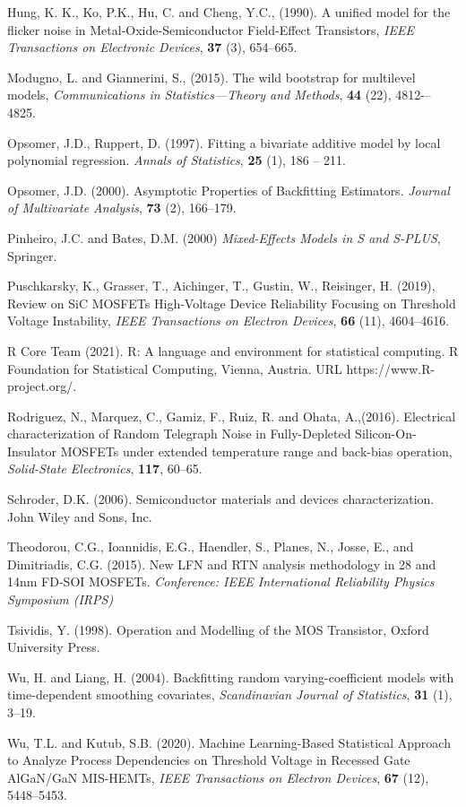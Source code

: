 \documentclass[sn-mathphys]{sn-jnl}%
\theoremstyle{thmstyleone}%
\theoremstyle{thmstyletwo}%
\theoremstyle{thmstylethree}%
\begin{document}
\begin{thebibliography}{00}
	 Hung, K. K., Ko, P.K., Hu, C. and Cheng, Y.C., (1990). A unified model for the flicker noise in Metal-Oxide-Semiconductor Field-Effect Transistors, {\it IEEE Transactions on Electronic Devices}, {\bf 37} (3), 654--665.
	
	 Modugno, L. and Giannerini, S., (2015). The wild bootstrap for multilevel models, {\it Communications in Statistics—Theory and Methods}, {\bf 44} (22), 4812-–4825.
	
	 Opsomer, J.D., Ruppert, D. (1997). Fitting a bivariate additive model by local polynomial regression. {\it Annals of Statistics}, {\bf 25} (1), 186 -- 211.
	
	 Opsomer, J.D. (2000). Asymptotic Properties of Backfitting Estimators. {\it Journal of Multivariate Analysis}, {\bf 73} (2),  166--179.
	
	 Pinheiro, J.C. and Bates, D.M. (2000) {\it Mixed-Effects Models in S and S-PLUS}, Springer.
	
	 Puschkarsky, K., Grasser, T., Aichinger, T., Gustin, W., Reisinger, H. (2019), Review on SiC MOSFETs High-Voltage Device Reliability Focusing on Threshold Voltage Instability, {\it IEEE Transactions on Electron Devices}, {\bf 66} (11), 4604--4616.
	
	R Core Team (2021). R: A language and environment for statistical computing. R Foundation for Statistical Computing, Vienna, Austria. URL
	https://www.R-project.org/.
	
	
	 Rodriguez, N., Marquez, C., Gamiz, F., Ruiz, R. and Ohata, A.,(2016).  Electrical characterization of Random Telegraph Noise in Fully-Depleted Silicon-On-Insulator MOSFETs under extended temperature range and back-bias operation, {\it Solid-State Electronics}, {\bf 117}, 60--65.
	
	 Schroder, D.K. (2006). Semiconductor materials and devices characterization. John Wiley and Sons, Inc.
	
	
	 Theodorou, C.G., Ioannidis, E.G., Haendler, S., Planes, N., Josse, E., and Dimitriadis, C.G. (2015). New LFN and RTN analysis methodology in 28 and 14nm FD-SOI MOSFETs. {\it Conference: IEEE International Reliability Physics Symposium (IRPS)}
	
	
	 Tsividis, Y. (1998). Operation and Modelling of the MOS Transistor, Oxford University Press.
	
	 Wu, H. and Liang, H. (2004). Backfitting random varying-coefficient models with time-dependent smoothing covariates, {\it Scandinavian Journal of Statistics}, {\bf 31} (1), 3--19.
	
	 Wu, T.L. and Kutub, S.B. (2020). Machine Learning-Based Statistical Approach to Analyze Process Dependencies on Threshold Voltage in Recessed Gate AlGaN/GaN MIS-HEMTs, {\it IEEE Transactions on Electron Devices}, {\bf 67} (12), 5448--5453.
	
	
\end{thebibliography}
\end{document}
